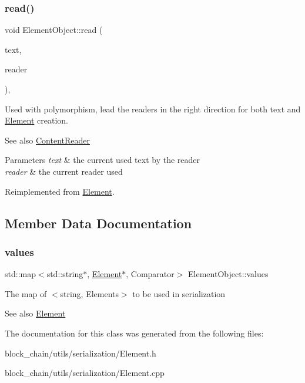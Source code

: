 \subsubsection{\texorpdfstring{read()}{read()}}
{\footnotesize\ttfamily void Element\+Object\+::read (\begin{DoxyParamCaption}\item[{std\+::string \&}]{text,  }\item[{const \mbox{\hyperlink{classContentReader}{Content\+Reader}} $\ast$}]{reader }\end{DoxyParamCaption})\hspace{0.3cm}{\ttfamily [override]}, {\ttfamily [virtual]}}

Used with polymorphism, lead the readers in the right direction for both text and \mbox{\hyperlink{classElement}{Element}} creation. \begin{DoxySeeAlso}{See also}
\mbox{\hyperlink{classContentReader}{Content\+Reader}}
\end{DoxySeeAlso}

\begin{DoxyParams}{Parameters}
{\em text} & the current used text by the reader \\
\hline
{\em reader} & the current reader used \\
\hline
\end{DoxyParams}


Reimplemented from \mbox{\hyperlink{classElement_ab468bd37a9558f5227837a9236bc9e4b}{Element}}.



\subsection{Member Data Documentation}
\mbox{\label{classElementObject_afd42a22449d05bcaaf3a194ecb2b4b4c}} 
\subsubsection{\texorpdfstring{values}{values}}
{\footnotesize\ttfamily std\+::map$<$std\+::string$\ast$, \mbox{\hyperlink{classElement}{Element}}$\ast$, Comparator$>$ Element\+Object\+::values}

The map of $<$string, Elements$>$ to be used in serialization \begin{DoxySeeAlso}{See also}
\mbox{\hyperlink{classElement}{Element}} 
\end{DoxySeeAlso}


The documentation for this class was generated from the following files\+:\begin{DoxyCompactItemize}
\item 
block\+\_\+chain/utils/serialization/Element.\+h\item 
block\+\_\+chain/utils/serialization/Element.\+cpp\end{DoxyCompactItemize}
